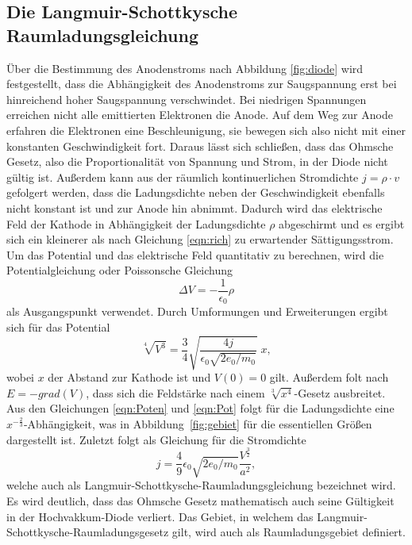 \subsection{Die Langmuir-Schottkysche Raumladungsgleichung}
Über die Bestimmung des Anodenstroms nach Abbildung \ref{fig:diode} wird festgestellt, dass die Abhängigkeit des Anodenstroms zur Saugspannung erst bei hinreichend hoher Saugspannung verschwindet.
Bei niedrigen Spannungen erreichen nicht alle emittierten Elektronen die Anode.
Auf dem Weg zur Anode erfahren die Elektronen eine Beschleunigung, sie bewegen sich also nicht mit einer konstanten Geschwindigkeit fort.
Daraus lässt sich schließen, dass das Ohmsche Gesetz, also die Proportionalität von Spannung und Strom, in der Diode nicht gültig ist.
Außerdem kann aus der räumlich kontinuerlichen Stromdichte $ j = \rho \cdot v$ gefolgert werden, dass die Ladungsdichte neben der Geschwindigkeit ebenfalls nicht konstant ist und zur Anode hin abnimmt.
Dadurch wird das elektrische Feld der Kathode in Abhängigkeit der Ladungsdichte $\rho$ abgeschirmt und es ergibt sich ein kleinerer als nach Gleichung \ref{eqn:rich} zu erwartender Sättigungsstrom.
Um das Potential und das elektrische Feld quantitativ zu berechnen, wird die Potentialgleichung oder Poissonsche Gleichung
\begin{equation}
    \label{eqn:Poten}
    \Delta V = - \frac{1}{\epsilon_0} \rho
\end{equation}
als Ausgangspunkt verwendet.
Durch Umformungen und Erweiterungen ergibt sich für das Potential
\begin{equation}
    \label{eqn:Pot}
    \sqrt[4]{V^{3}} = \frac{3}{4} \sqrt{\frac{4j}{\epsilon_0 \sqrt{2e_0/m_0}}}\; x,
\end{equation}
wobei $x$ der Abstand zur Kathode ist und $V(0) = 0$ gilt.
Außerdem folt nach $E = -grad(V)$, dass sich die Feldstärke nach einem $\sqrt[3]{x^{4}}$-Gesetz ausbreitet.
Aus den Gleichungen \ref{eqn:Poten} und \ref{eqn:Pot} folgt für die Ladungsdichte eine $x^{-\frac{2}{3}}$-Abhängigkeit, was in Abbildung~\ref{fig:gebiet} für die essentiellen Größen dargestellt ist.
Zuletzt folgt als Gleichung für die Stromdichte
\begin{equation}
    \label{eqn:strom}
    j = \frac{4}{9} \epsilon_0 \sqrt{2 e_0/m_0} \frac{V^{\frac{3}{2}}}{a^{2}}, 
\end{equation}
welche auch als Langmuir-Schottkysche-Raumladungsgleichung bezeichnet wird.
Es wird deutlich, dass das Ohmsche Gesetz mathematisch auch seine Gültigkeit in der Hochvakkum-Diode verliert.
Das Gebiet, in welchem das Langmuir-Schottkysche-Raumladungsgesetz gilt, wird auch als Raumladungsgebiet definiert.

